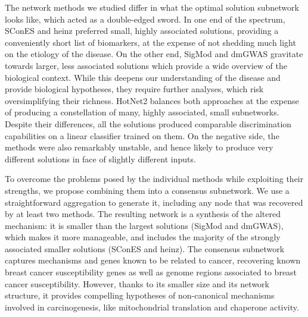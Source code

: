 \documentclass[twocolumn, 10pt]{article}
\begin{document}
The network methods we studied differ in what the optimal solution subnetwork looks like, which acted as a double-edged sword. In one end of the spectrum, SConES and heinz preferred small, highly associated solutions, providing a conveniently short list of biomarkers, at the expense of not shedding much light on the etiology of the disease. On the other end, SigMod and dmGWAS gravitate towards larger, less associated solutions which provide a wide overview of the biological context. While this deepens our understanding of the disease and provide biological hypotheses, they require further analyses, which risk oversimplifying their richness. HotNet2 balances both approaches at the expense of producing a constellation of many, highly associated, small subnetworks. Despite their differences, all the solutions produced comparable discrimination capabilities on a linear classifier trained on them. On the negative side, the methods were also remarkably unstable, and hence likely to produce very different solutions in face of slightly different inputs.

To overcome the problems posed by the individual methods while exploiting their strengths, we propose combining them into a consensus subnetwork. We use a straightforward aggregation to generate it, including any node that was recovered by at least two methods. The resulting network is a synthesis of the altered mechanism: it is smaller than the largest solutions (SigMod and dmGWAS), which makes it more manageable, and includes the majority of the strongly associated smaller solutions (SConES and heinz). The consensus subnetwork captures mechanisms and genes known to be related to cancer, recovering known breast cancer susceptibility genes as well as genome regions associated to breast cancer susceptibility. However, thanks to its smaller size and its network structure, it provides compelling hypotheses of non-canonical mechanisms involved in carcinogenesis, like mitochondrial translation and chaperone activity.
\end{document}
